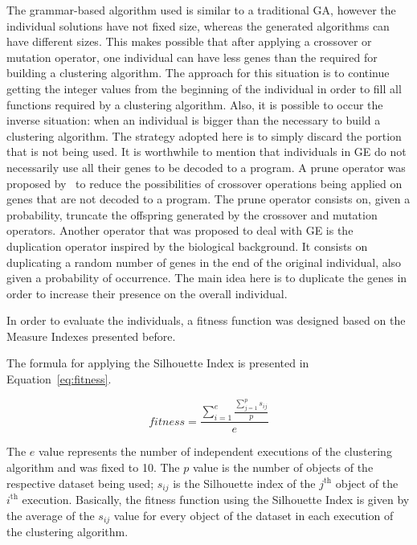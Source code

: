 \documentclass[conference]{IEEEtran}
\begin{document}
	
	The grammar-based algorithm used is similar to a traditional GA, however the individual solutions have not fixed size, whereas the generated algorithms can have different sizes. This makes possible that after applying a crossover or mutation operator, one individual can have less genes than the required for building a clustering algorithm. The approach for this situation is to continue getting the integer values from the beginning of the individual in order to fill all functions required by a clustering algorithm. Also, it is possible to occur the inverse situation: when an individual is bigger than the necessary to build a clustering algorithm. The strategy adopted here is to simply discard the portion that is not being used. It is worthwhile to mention that individuals in GE do not necessarily use all their genes to be decoded to a program. A prune operator was proposed by~\cite{ryan1998grammatical} to reduce the possibilities of crossover operations being applied on genes that are not decoded to a program. The prune operator consists on, given a probability, truncate the offspring generated by the crossover and mutation operators. Another operator that was proposed to deal with GE is the duplication operator inspired by the biological background. It consists on duplicating a random number of genes in the end of the original individual, also given a probability of occurrence. The main idea here is to duplicate the genes in order to increase their presence on the overall individual.
	
	
	In order to evaluate the individuals, a fitness function was designed based on the Measure Indexes presented before.
	
	
	The formula for applying the Silhouette Index is presented in Equation~\ref{eq:fitness}.
	
	
	\begin{equation} \label{eq:fitness}
		fitness = \frac{\sum_{i=1}^e \frac{\sum_{j=1}^{p} s_{ij}}{p}}{e}
	\end{equation}
	
	
	The $e$ value represents the number of independent executions of the clustering algorithm and was fixed to 10. The $p$ value is the number of objects of the respective dataset being used; $s_{ij}$ is the Silhouette index of the $j^{\text{th}}$ object of the $i^{\text{th}}$ execution. Basically, the fitness function using the Silhouette Index is given by the average of the $s_{ij}$ value for every object of the dataset in each execution of the clustering algorithm.
	
\end{document}
